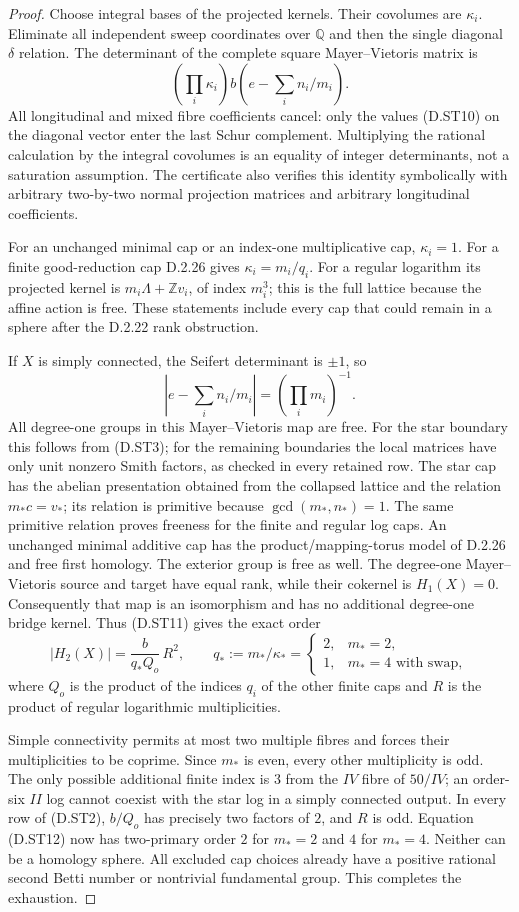 \begin{proof}
Choose integral bases of the projected kernels. Their
covolumes are $\kappa_i$. Eliminate all independent sweep
coordinates over $\mathbb Q$ and then the single diagonal
$\delta$ relation. The determinant of the complete square
Mayer--Vietoris matrix is
\[
 \left(\prod_i\kappa_i\right)
                   b\left(e-\sum_i n_i/m_i\right).         \tag{D.ST11}
\]
All longitudinal and mixed fibre coefficients cancel: only
the values (D.ST10) on the diagonal vector enter the last
Schur complement. Multiplying the rational calculation by the
integral covolumes is an equality of integer determinants,
not a saturation assumption. The certificate also verifies
this identity symbolically with arbitrary two-by-two normal
projection matrices and arbitrary longitudinal coefficients.

For an unchanged minimal cap or an index-one multiplicative
cap, $\kappa_i=1$. For a finite good-reduction cap D.2.26 gives
$\kappa_i=m_i/q_i$. For a regular logarithm its projected
kernel is $m_i\Lambda+\mathbb Z v_i$, of index $m_i^3$;
this is the full lattice because the affine action is free.
These statements include every cap that could remain in a
sphere after the D.2.22 rank obstruction.

If $X$ is simply connected, the Seifert determinant is $\pm1$,
so
\[
 \left|e-\sum_i n_i/m_i\right|=(\prod_i m_i)^{-1}.
\]
All degree-one groups in this Mayer--Vietoris map are free.
For the star boundary this follows from (D.ST3); for the
remaining boundaries the local matrices have only unit
nonzero Smith factors, as checked in every retained row.
The star cap has the abelian presentation obtained from the
collapsed lattice and the relation $m_*c=v_*$; its relation
is primitive because $\gcd(m_*,n_*)=1$. The same primitive
relation proves freeness for the finite and regular log caps.
An unchanged minimal additive cap has the product/mapping-torus
model of D.2.26 and free first homology. The exterior group is
free as well. The degree-one Mayer--Vietoris source and target
have equal rank, while their cokernel is $H_1(X)=0$.
Consequently that map is an isomorphism and has no additional
degree-one bridge kernel.
Thus (D.ST11) gives the exact order
\[
 |H_2(X)|=\frac{b}{q_*Q_o}\,R^2,\qquad
 q_*:=m_*/\kappa_*=
 \begin{cases}2,&m_*=2,\\1,&m_*=4\text{ with swap},\end{cases} \tag{D.ST12}
\]
where $Q_o$ is the product of the indices $q_i$ of the other
finite caps and $R$ is the product of regular logarithmic
multiplicities.

Simple connectivity permits at most two multiple fibres and
forces their multiplicities to be coprime. Since $m_*$ is
even, every other multiplicity is odd. The only possible
additional finite index is $3$ from the $IV$ fibre of $50/IV$;
an order-six $II$ log cannot coexist with the star log in a
simply connected output. In every row of (D.ST2),
$b/Q_o$ has precisely two factors of $2$, and $R$ is odd.
Equation (D.ST12) now has two-primary order $2$ for $m_*=2$
and $4$ for $m_*=4$. Neither can be a homology sphere.
All excluded cap choices already have a positive rational
second Betti number or nontrivial fundamental group. This
completes the exhaustion.
\end{proof}
